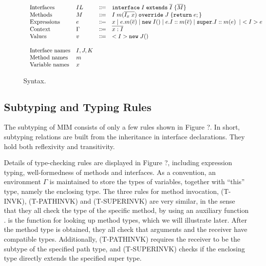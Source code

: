 \begin{figure*}[t]
\begin{displaymath}
\begin{array}{l}
\begin{array}{llrl}
\text{Interfaces}   & IL & \Coloneqq & \texttt{interface} \; I \; \texttt{extends} \; \overline{I} \; {\{} \overline{M} {\}} \\
\text{Methods}      & M  & \Coloneqq & I \; m (\overline{I_x \; x}) \; \texttt{override} \; J \; {\{} \texttt{return} \; e ; {\}} \\
\text{Expressions}  & e  & \Coloneqq & x \mid
e.m(\overline{e}) \mid
\texttt{new} \; I() \mid
e.I::m(\overline{e}) \mid
\texttt{super}.I::m(e) \; \mid \; <I> e \\
\text{Context}      & \Gamma & \Coloneqq & \overline{x:I} \\
\text{Values}       & v & \Coloneqq & <I>\texttt{new} \; J() \\
\\
\text{Interface names} & I, J, K & & \\
\text{Method names} & m & & \\
\text{Variable names} & x & &
\end{array}
\end{array}
\end{displaymath}
\caption{Syntax. }\label{fig:syntax}
\end{figure*}

\subsection{Subtyping and Typing Rules}
The subtyping of MIM consists of only a few rules shown in Figure ?.
In short, subtyping relations are built from the inheritance in interface
declarations. They hold both reflexivity and transitivity.

Details of type-checking rules are displayed in Figure ?, including expression
typing, well-formedness of methods and interfaces. As a convention, an environment
$\Gamma$ is maintained to store the types of variables, together with ``this'' type, namely
the enclosing type. The three rules for method invocation, (T-INVK), (T-PATHINVK) and (T-SUPERINVK)
are very similar, in the sense that they all check the type of the specific method, by using
an auxiliary function \mtype. \mtype is the function for looking up method types, which we will
illustrate later. After the method type is obtained, they all check that arguments and the receiver
have compatible types. Additionally, (T-PATHINVK) requires the receiver to be the subtype of the specified
path type, and (T-SUPERINVK) checks if the enclosing type directly extends the specified super type.

